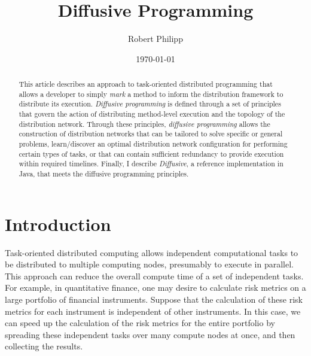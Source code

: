 \documentclass[11pt]{article}
\begin{document}
\title{Diffusive Programming}
\author{Robert Philipp}
\date{\today}
\maketitle

%
%
\begin{abstract}
This article describes an approach to task-oriented distributed programming that allows a developer to simply \emph{mark} a method to inform the distribution framework to distribute its execution. \emph{Diffusive programming} is defined through a set of principles that govern the action of distributing method-level execution and the topology of the distribution network. Through these principles, \emph{diffusive programming} allows the construction of distribution networks that can be tailored to solve specific or general problems,  learn/discover an optimal distribution network configuration for performing certain types of tasks, or that can contain sufficient redundancy to provide execution within required timelines. Finally, I describe \emph{Diffusive}, a reference implementation in Java, that meets the diffusive programming principles.
\end{abstract}

%
%
\section{Introduction}
Task-oriented distributed computing allows independent computational tasks to be distributed to multiple computing nodes, presumably to execute in parallel. This approach can reduce the overall compute time of a set of independent tasks. For example, in quantitative finance, one may desire to calculate risk metrics on a large portfolio of financial instruments. Suppose that the calculation of these risk metrics for each instrument is independent of other instruments. In this case, we can speed up the calculation of the risk metrics for the entire portfolio by spreading these independent tasks over many compute nodes at once, and then collecting the results.
\end{document}
